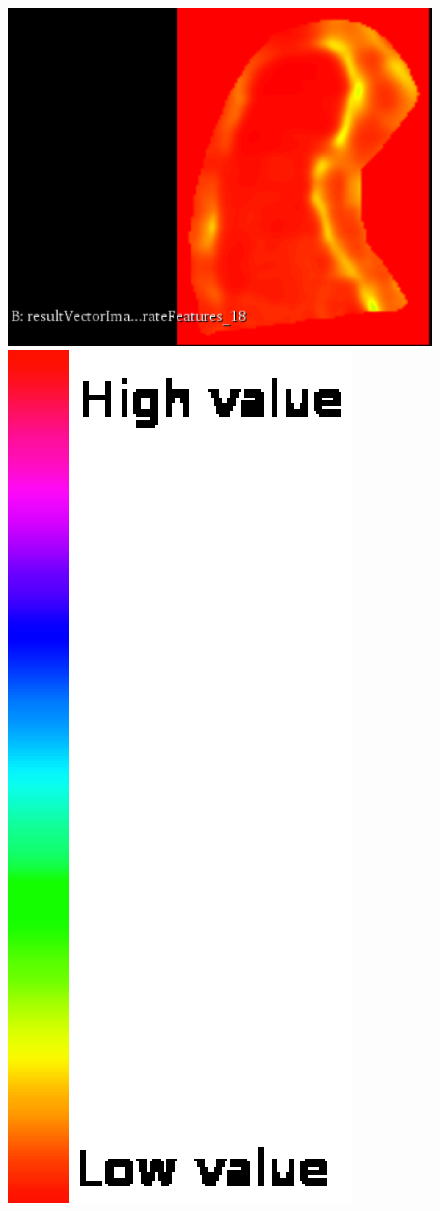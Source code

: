 \documentclass{InsightArticle}
\begin{document}
\begin{figure}[H]
  \begin{center}
    \includegraphics[scale=0.3]{figures/HaralickCorrelation.eps}
    \includegraphics[scale=0.32]{figures/discreteFullRainbow.eps}

\end{center}
\end{figure}
\end{document}
